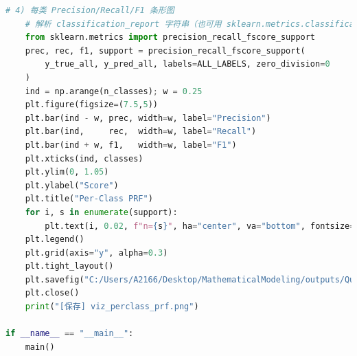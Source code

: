 \documentclass[a4paper]{CPIPC}
\numberwithin{equation}{section}
\begin{document}
\begin{lstlisting}[language=Python, caption=CNN + SVM Classifier]
    # 4) 每类 Precision/Recall/F1 条形图
    # 解析 classification_report 字符串（也可用 sklearn.metrics.classification_report(output_dict=True) 更方便）
    from sklearn.metrics import precision_recall_fscore_support
    prec, rec, f1, support = precision_recall_fscore_support(
        y_true_all, y_pred_all, labels=ALL_LABELS, zero_division=0
    )
    ind = np.arange(n_classes); w = 0.25
    plt.figure(figsize=(7.5,5))
    plt.bar(ind - w, prec, width=w, label="Precision")
    plt.bar(ind,     rec,  width=w, label="Recall")
    plt.bar(ind + w, f1,   width=w, label="F1")
    plt.xticks(ind, classes)
    plt.ylim(0, 1.05)
    plt.ylabel("Score")
    plt.title("Per-Class PRF")
    for i, s in enumerate(support):
        plt.text(i, 0.02, f"n={s}", ha="center", va="bottom", fontsize=9, rotation=0)
    plt.legend()
    plt.grid(axis="y", alpha=0.3)
    plt.tight_layout()
    plt.savefig("C:/Users/A2166/Desktop/MathematicalModeling/outputs/QuestionTwo/viz_perclass_prf.png", dpi=160)
    plt.close()
    print("[保存] viz_perclass_prf.png")

if __name__ == "__main__":
    main()
\end{lstlisting}
\end{document}
